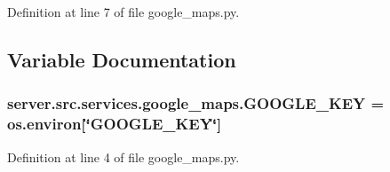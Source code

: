 Definition at line 7 of file google\+\_\+maps.\+py.



\subsection{Variable Documentation}
\subsubsection[{\texorpdfstring{G\+O\+O\+G\+L\+E\+\_\+\+K\+EY}{GOOGLE_KEY}}]{\setlength{\rightskip}{0pt plus 5cm}server.\+src.\+services.\+google\+\_\+maps.\+G\+O\+O\+G\+L\+E\+\_\+\+K\+EY = os.\+environ\mbox{[}\char`\"{}G\+O\+O\+G\+L\+E\+\_\+\+K\+EY\char`\"{}\mbox{]}}\hypertarget{namespaceserver_1_1src_1_1services_1_1google__maps_a8841217dfa16c2d739c8d789f54b156d}{}\label{namespaceserver_1_1src_1_1services_1_1google__maps_a8841217dfa16c2d739c8d789f54b156d}


Definition at line 4 of file google\+\_\+maps.\+py.

